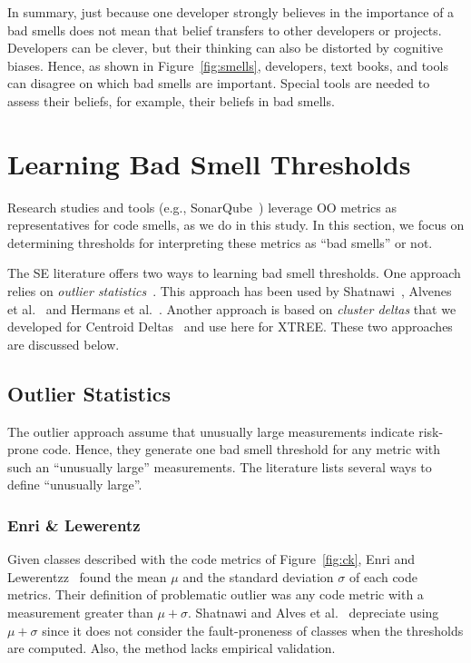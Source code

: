 \documentclass{sig-alternate}
\newcommand{\fig}[1]{Figure~\ref{fig:#1}}
\theoremstyle{break}
\begin{document}
In summary, just because one developer strongly believes in the importance of a bad smells does not mean that belief transfers to other developers or projects.
Developers can be clever, but their thinking can also be distorted
by cognitive biases.
Hence, as shown in \fig{smells}, developers, text books, and tools 
can disagree on which bad smells are important.
Special tools are needed to assess their beliefs, for example, their beliefs in
bad smells.  
 

\section{Learning Bad Smell Thresholds}\label{sect:bst}
Research studies and tools (e.g., SonarQube~\cite{sq15}) leverage OO metrics as representatives for code smells, as we do in this study. In this section, we focus on determining thresholds for interpreting these metrics as ``bad smells'' or not.

The SE literature offers  two ways to 
learning bad smell thresholds.
One approach relies on 
{\em outlier statistics}~\cite{erni96,bender99}. This approach
has been used   by Shatnawi~\cite{Shatnawi10}, Alvenes et al.~\cite{Alves2010}
    and Hermans et al.~\cite{hermans15}.
    Another approach is 
    based on {\em cluster deltas} that we developed
    for   Centroid Deltas~\cite{me12c} and 
    use here for XTREE. 
    These two approaches are discussed below.
\subsection{  Outlier Statistics}\label{sect:p}

The outlier approach assume that unusually large measurements indicate risk-prone code.
Hence, they generate one bad smell threshold for any metric
with such an ``unusually large'' measurements. 
The literature lists several ways to define ``unusually large''.

\subsubsection{Enri \& Lewerentz}
Given classes described with the  code metrics of \fig{ck},
Enri and Lewerentzz~\cite{erni96} found the   mean $\mu$ and the standard deviation $\sigma$
of each
code metrics. Their definition of problematic outlier was any code
metric with a measurement greater than $\mu+\sigma$.
Shatnawi and Alves et al.~\cite{Shatnawi10,Alves2010} depreciate
using $\mu+\sigma$ since it does not consider the fault-proneness of classes when the thresholds are computed. Also, the method lacks  empirical validation.
\end{document}
